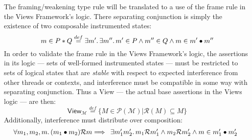 


 The framing/weakening type rule will be translated to a use of the frame rule in the Views Framework's logic.  There separating conjunction is simply the existence of two composable instrumented states:
\[ m \in P \ast Q   \stackrel{def}{=} \exists m' \ldotp \exists m'' \ldotp m' \in P \land m'' \in Q \land m \in m' \bullet m''\]
In order to validate the frame rule in the Views Framework's logic, the assertions in its logic --- sets of well-formed instrumented states --- must be restricted to sets of logical states that are \emph{stable} with respect to expected interference from other threads or contexts, and interference must be compatible in some way with separating conjunction.
Thus a \textsf{View} --- the actual base assertions in the Views logic --- are then:
\[\textsf{View}_{\mathcal{M}} \stackrel{def}{=} \{ M \in \mathcal{P}(\mathcal{M}) | \mathcal{R}(M) \subseteq M\}\]
Additionally, interference must distribute over composition:
\[ \forall m_{1}, m_{2}, m\ldotp (m_{1} \bullet  m_{2})\mathcal{R}m \Longrightarrow \begin{array}{ll}  \exists  m'_{1} m'_{2} \ldotp m_{1} \mathcal{R} m'_{1} \land m_{2} \mathcal{R} m'_{2} \land  m \in m'_{1} \bullet m'_{2} \end{array}\]

